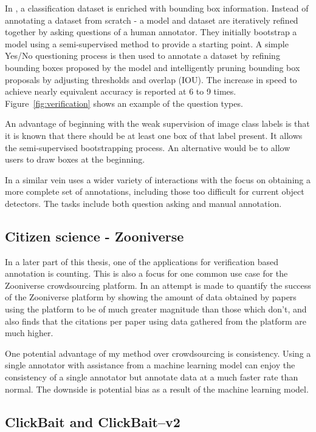 In \cite{Papadopoulos2016}, a classification dataset is enriched with bounding box information. Instead of annotating a dataset from scratch - a model and dataset are iteratively refined together by asking questions of a human annotator. They initially bootstrap a model using a semi-supervised method  \cite{Cinbis2017} to provide a starting point. A simple Yes/No questioning process is then used to annotate a dataset by refining bounding boxes proposed by the model and intelligently pruning bounding box proposals by adjusting thresholds and overlap (\gls{IOU}). The increase in speed to achieve nearly equivalent accuracy is reported at 6 to 9 times.  Figure~\ref{fig:verification} shows an example of the question types.

An advantage of beginning with the weak supervision of image class labels is that it is known that there should be at least one box of that label present. It allows the semi-supervised bootstrapping process. An alternative would be to allow users to draw boxes at the beginning. 

In a similar vein \cite{Russakovsky2015a} uses a wider variety of interactions with the focus on obtaining a more complete set of annotations, including those too difficult for current object detectors. The tasks include both question asking and manual annotation.


\subsection{Citizen science - Zooniverse \cite{Zooniverse}}

In a later part of this thesis, one of the applications for verification based annotation is counting. This is also a focus for one common use case for the Zooniverse crowdsourcing platform. In \cite{Watson2018} an attempt is made to quantify the success of the Zooniverse platform by showing the amount of data obtained by papers using the platform to be of much greater magnitude than those which don't, and also finds that the citations per paper using data gathered from the platform are much higher. 

One potential advantage of my method over crowdsourcing is consistency. Using a single annotator with assistance from a machine learning model can enjoy the consistency of a single annotator but annotate data at a much faster rate than normal. The downside is potential bias as a result of the machine learning model.

\subsection{ClickBait and ClickBait--v2 \cite{Teng2017, Teng2018}}

